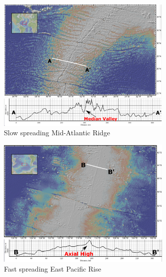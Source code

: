 \documentclass[draft,gc]{agutex}
\begin{document}
\begin{figure}
\noindent\includegraphics[width=20pc]{./Figures/fig_Intro1_1.eps}
  \caption{Slow spreading Mid-Atlantic Ridge}
  \label{fig_Intro1_1}
\end{figure}

\begin{figure}
\noindent\includegraphics[width=20pc]{./Figures/fig_Intro1_3.eps}
  \caption{Fast spreading East Pacific Rise}
  \label{fig_Intro1_3}
\end{figure}
\end{document}

